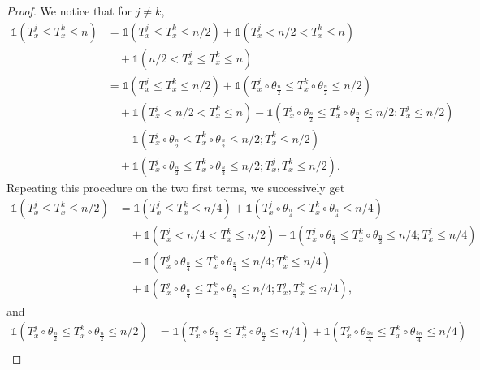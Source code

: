\documentclass[10pt,a4paper]{amsart}
\newcommand{\1}{\mathds{1}}
\numberwithin{equation}{section}
\begin{document}
\begin{proof}
    We notice that for $j\ne k$,
    \begin{align*}
        \1\left(T_x^j\le T_x^k\le n\right)&=\1\left(T_x^j\le T_x^k\le n/2\right)+\1\left(T_x^j<n/2<T_x^k\le n\right)\\
        &\hspace{1em}+\1\left(n/2<T_x^j\le T_x^k\le n\right)\\
        &=\1\left(T_x^j\le T_x^k\le n/2\right)+\1\left(T_x^j\circ\theta_{\frac n2}\le T_x^k\circ\theta_{\frac n2}\le n/2\right)\\
        &\hspace{1em}+\1\left(T_x^j<n/2<T_x^k\le n\right)-\1\left(T_x^j\circ\theta_{\frac n2}\le T_x^k\circ\theta_{\frac n2}\le n/2; T_x^j\le n/2\right)\\
        &\hspace{1em}-\1\left(T_x^j\circ\theta_{\frac n2}\le T_x^k\circ\theta_{\frac n2}\le n/2; T_x^k\le n/2\right)\\
        &\hspace{1em}+\1\left(T_x^j\circ\theta_{\frac n2}\le T_x^k\circ\theta_{\frac n2}\le n/2; T_x^j,T_x^k\le n/2\right).
    \end{align*}
    Repeating this procedure on the two first terms, we successively get
    \begin{align*}
        \1\left(T_x^j\le T_x^k\le n/2\right)&=\1\left(T_x^j\le T_x^k\le n/4\right)+\1\left(T_x^j\circ\theta_{\frac n4}\le T_x^k\circ\theta_{\frac n4}\le n/4\right)\\
        &\hspace{1em}+\1\left(T_x^j<n/4<T_x^k\le n/2\right)-\1\left(T_x^j\circ\theta_{\frac n4}\le T_x^k\circ\theta_{\frac n2}\le n/4; T_x^j\le n/4\right)\\
        &\hspace{1em}-\1\left(T_x^j\circ\theta_{\frac n4}\le T_x^k\circ\theta_{\frac n4}\le n/4; T_x^k\le n/4\right)\\
        &\hspace{1em}+\1\left(T_x^j\circ\theta_{\frac n4}\le T_x^k\circ\theta_{\frac n4}\le n/4; T_x^j,T_x^k\le n/4\right),
    \end{align*}
    and
    \begin{align*}
        \1\left(T_x^j\circ\theta_{\frac n2}\le T_x^k\circ\theta_{\frac n2}\le n/2\right)&=\1\left(T_x^j\circ\theta_{\frac n2}\le T_x^k\circ\theta_{\frac n2}\le n/4\right)+\1\left(T_x^j\circ\theta_{\frac {3n}4}\le T_x^k\circ\theta_{\frac{3n}4}\le n/4\right)\\

\end{align*}
\end{proof}
\end{document}
